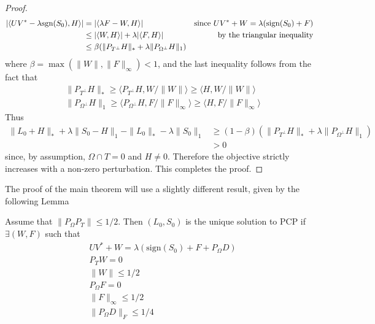 \documentclass{../common/projectreport}
\begin{document}
\begin{proof}
\begin{align*}
|\langle UV^* - \lambda  \text{sgn}(S_0), H\rangle|
& = |\langle \lambda F - W, H\rangle|  & \text{since } UV^* + W = \lambda(\text{sign}(S_0) + F) \\
&\leq |\langle W, H \rangle| + \lambda |\langle F, H \rangle| & \text{by the triangular inequality} \\
&\leq \beta (\|P_{T^\perp} H\|_* + \lambda \|P_{\Omega^\perp} H\|_1)
\end{align*}
where $\beta = \max (\|W\|, \|F\|_\infty) < 1$, and the last inequality follows from the fact that
\[
\begin{aligned}
& \|P_{T^\perp} H\|_* \geq \langle P_{T^\perp} H, W/\|W\| \rangle \geq \langle H, W/\|W\| \rangle\\
& \|P_{\Omega^\perp} H\|_1 \geq \langle P_{\Omega^\perp} H, F/\|F\|_\infty \rangle \geq \langle H, F/\|F\|_\infty \rangle
\end{aligned}
\]
Thus
\begin{align*}
\|L_0 + H\|_* + \lambda \|S_0 - H\|_1 - \|L_0\|_* - \lambda \|S_0 \|_1 
&\geq  (1-\beta) \left( \|P_{T^\perp} H\|_* + \lambda \|P_{\Omega^\perp} H\|_1 \right) \\
& > 0
\end{align*}
since, by assumption, $\Omega \cap T = {0}$ and $H \neq 0$. Therefore the objective strictly increases with a non-zero perturbation. This completes the proof.

\end{proof}


The proof of the main theorem will use a slightly different result, given by the following Lemma
\begin{lemma}
\label{lem:dual_cert}
Assume that $\|P_\Omega P_T \| \leq 1/2$. Then $(L_0,S_0)$ is the unique solution to PCP if $\exists (W, F)$ such that
\begin{equation}
\begin{aligned}
& UV^* + W = \lambda(\text{sign}(S_0) + F + P_\Omega D) \\
& P_T W = 0 \\
& \|W\| \leq 1/2 \\
& P_\Omega F = 0 \\
& \|F\|_\infty \leq 1/2 \\
&\|P_\Omega D \|_F \leq 1/4
\end{aligned}
\end{equation}

\end{lemma}
\end{document}
